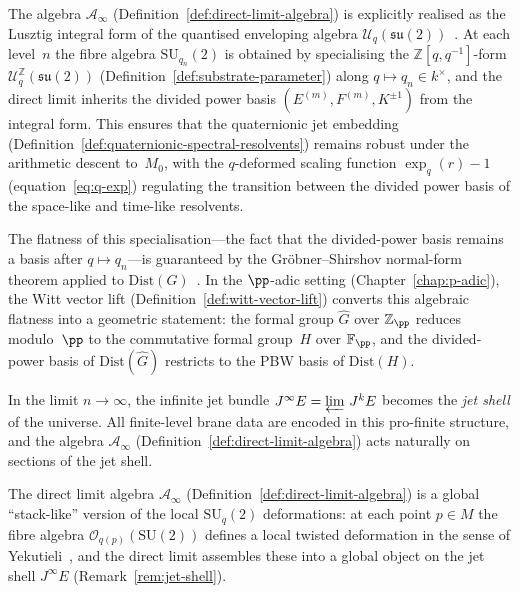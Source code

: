 \begin{remark}
\label{rem:direct-limit-lusztig}
The algebra $\mathcal{A}_\infty$
(Definition~\ref{def:direct-limit-algebra}) is explicitly realised as the
Lusztig integral form of the quantised enveloping algebra
$\mathcal{U}_q(\mathfrak{su}(2))$~\cite{lusztig1993}.  At each level~$n$
the fibre algebra $\mathrm{SU}_{q_n}(2)$ is obtained by specialising the
$\mathbb{Z}[q,q^{-1}]$-form
$\mathcal{U}^{\mathbb{Z}}_q(\mathfrak{su}(2))$
(Definition~\ref{def:substrate-parameter}) along
$q \mapsto q_n \in k^{\times}$, and the direct limit inherits the divided
power basis $(E^{(m)}, F^{(m)}, K^{\pm 1})$ from the integral form.  This
ensures that the quaternionic jet embedding
(Definition~\ref{def:quaternionic-spectral-resolvents}) remains robust
under the arithmetic descent to~$M_0$, with the $q$-deformed scaling
function $\exp_q(r) - 1$ (equation~\eqref{eq:q-exp}) regulating the
transition between the divided power basis of the space-like and time-like
resolvents.

The flatness of this specialisation---the fact that the divided-power
basis remains a basis after $q \mapsto q_n$---is guaranteed by the
Gr\"obner--Shirshov normal-form theorem applied to
$\mathrm{Dist}(G)$~\cite{fred2005}.  In the $\pp$-adic setting
(Chapter~\ref{chap:p-adic}), the Witt vector lift
(Definition~\ref{def:witt-vector-lift}) converts this algebraic
flatness into a geometric statement: the formal group $\widehat{G}$
over $\mathbb{Z}_\pp$ reduces modulo~$\pp$ to the commutative
formal group~$H$ over $\mathbb{F}_\pp$, and the divided-power basis
of $\mathrm{Dist}(\widehat{G})$ restricts to the PBW basis of
$\mathrm{Dist}(H)$.
\end{remark}

\begin{remark}
\label{rem:jet-shell}
In the limit $n \to \infty$, the infinite jet bundle
$J^\infty E = \varprojlim\, J^k E$ becomes the \emph{jet shell} of the
universe.  All finite-level brane data are encoded in this pro-finite
structure, and the algebra $\mathcal{A}_\infty$
(Definition~\ref{def:direct-limit-algebra}) acts naturally on sections of the
jet shell.
\end{remark}

\begin{remark}
\label{rem:stack-like-structure}
The direct limit algebra $\mathcal{A}_\infty$
(Definition~\ref{def:direct-limit-algebra}) is a global ``stack-like''
version of the local $\mathrm{SU}_q(2)$ deformations: at each point
$p \in M$ the fibre algebra $\mathcal{O}_{q(p)}(\mathrm{SU}(2))$
defines a local twisted deformation in the sense of
Yekutieli~\cite{yekutieli2008}, and the direct limit assembles these
into a global object on the jet shell $J^\infty E$
(Remark~\ref{rem:jet-shell}).
\end{remark}

